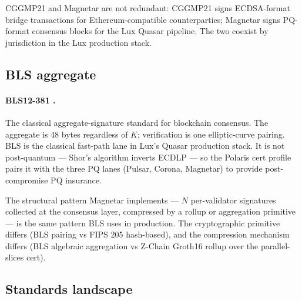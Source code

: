 CGGMP21 and Magnetar are not redundant: CGGMP21 signs ECDSA-format
bridge transactions for Ethereum-compatible counterparties;
Magnetar signs PQ-format consensus blocks for the Lux Quasar
pipeline. The two coexist by jurisdiction in the Lux production
stack.

\subsection{BLS aggregate}
\label{sec:related:bls}

\paragraph{BLS12-381 \cite{bls,boneh2001short,lp075}.} The classical
aggregate-signature standard for blockchain consensus. The
aggregate is 48 bytes regardless of $K$; verification is one
elliptic-curve pairing. BLS is the classical fast-path lane in
Lux's Quasar production stack. It is not post-quantum --- Shor's
algorithm inverts ECDLP --- so the Polaris cert profile pairs it
with the three PQ lanes (Pulsar, Corona, Magnetar) to provide
post-compromise PQ insurance.

The structural pattern Magnetar implements --- $N$ per-validator
signatures collected at the consensus layer, compressed by a
rollup or aggregation primitive --- is the same pattern BLS uses
in production. The cryptographic primitive differs (BLS pairing
vs FIPS 205 hash-based), and the compression mechanism differs
(BLS algebraic aggregation vs Z-Chain Groth16 rollup over the
parallel-slices cert).

\subsection{Standards landscape}
\label{sec:related:standards}

